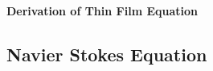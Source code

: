 \documentclass[11pt, oneside]{article}
\begin{document}
\begin{center}
\textbf{\Large{Derivation of Thin Film Equation
}}
\end{center}

\subsection{Navier Stokes Equation}
    
\end{document}
